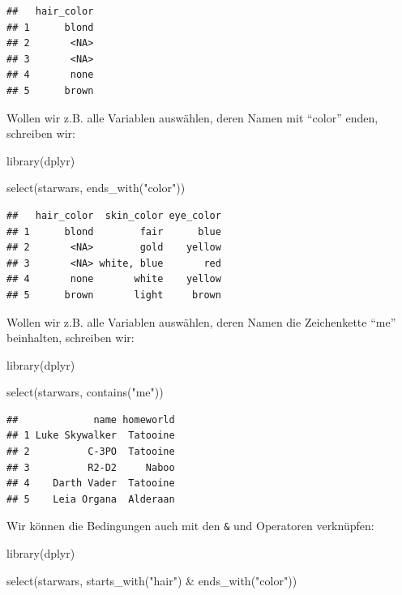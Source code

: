\documentclass[
]{book}
\newenvironment{Shaded}{\begin{snugshade}}{\end{snugshade}}
\newcommand{\FunctionTok}[1]{\textcolor[rgb]{0.00,0.00,0.00}{#1}}
\newcommand{\NormalTok}[1]{#1}
\newcommand{\SpecialCharTok}[1]{\textcolor[rgb]{0.00,0.00,0.00}{#1}}
\newcommand{\StringTok}[1]{\textcolor[rgb]{0.31,0.60,0.02}{#1}}
\begin{document}
\begin{verbatim}
##   hair_color
## 1      blond
## 2       <NA>
## 3       <NA>
## 4       none
## 5      brown
\end{verbatim}

Wollen wir z.B. alle Variablen auswählen, deren Namen mit ``color'' enden, schreiben wir:

\begin{Shaded}
\begin{Highlighting}[]
\FunctionTok{library}\NormalTok{(dplyr)}

\FunctionTok{select}\NormalTok{(starwars, }\FunctionTok{ends\_with}\NormalTok{(}\StringTok{"color"}\NormalTok{))}
\end{Highlighting}
\end{Shaded}

\begin{verbatim}
##   hair_color  skin_color eye_color
## 1      blond        fair      blue
## 2       <NA>        gold    yellow
## 3       <NA> white, blue       red
## 4       none       white    yellow
## 5      brown       light     brown
\end{verbatim}

Wollen wir z.B. alle Variablen auswählen, deren Namen die Zeichenkette ``me'' beinhalten, schreiben wir:

\begin{Shaded}
\begin{Highlighting}[]
\FunctionTok{library}\NormalTok{(dplyr)}

\FunctionTok{select}\NormalTok{(starwars, }\FunctionTok{contains}\NormalTok{(}\StringTok{"me"}\NormalTok{))}
\end{Highlighting}
\end{Shaded}

\begin{verbatim}
##             name homeworld
## 1 Luke Skywalker  Tatooine
## 2          C-3PO  Tatooine
## 3          R2-D2     Naboo
## 4    Darth Vader  Tatooine
## 5    Leia Organa  Alderaan
\end{verbatim}

Wir können die Bedingungen auch mit den \texttt{\&} und \texttt{\textbar{}} Operatoren verknüpfen:

\begin{Shaded}
\begin{Highlighting}[]
\FunctionTok{library}\NormalTok{(dplyr)}

\FunctionTok{select}\NormalTok{(starwars, }\FunctionTok{starts\_with}\NormalTok{(}\StringTok{"hair"}\NormalTok{) }\SpecialCharTok{\&} \FunctionTok{ends\_with}\NormalTok{(}\StringTok{"color"}\NormalTok{))}
\end{Highlighting}
\end{Shaded}
\end{document}

